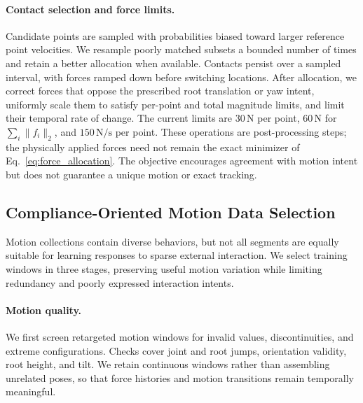 \paragraph{Contact selection and force limits.}
Candidate points are sampled with probabilities biased toward larger reference point velocities. We resample poorly matched subsets a bounded number of times and retain a better allocation when available. Contacts persist over a sampled interval, with forces ramped down before switching locations. After allocation, we correct forces that oppose the prescribed root translation or yaw intent, uniformly scale them to satisfy per-point and total magnitude limits, and limit their temporal rate of change. The current limits are $30\,\mathrm{N}$ per point, $60\,\mathrm{N}$ for $\sum_i\|f_i\|_2$, and $150\,\mathrm{N/s}$ per point. These operations are post-processing steps; the physically applied forces need not remain the exact minimizer of Eq.~\eqref{eq:force_allocation}. The objective encourages agreement with motion intent but does not guarantee a unique motion or exact tracking.

\subsection{Compliance-Oriented Motion Data Selection}
\label{sec:data_selection}

Motion collections contain diverse behaviors, but not all segments are equally suitable for learning responses to sparse external interaction. We select training windows in three stages, preserving useful motion variation while limiting redundancy and poorly expressed interaction intents.

\paragraph{Motion quality.}
We first screen retargeted motion windows for invalid values, discontinuities, and extreme configurations. Checks cover joint and root jumps, orientation validity, root height, and tilt. We retain continuous windows rather than assembling unrelated poses, so that force histories and motion transitions remain temporally meaningful.

